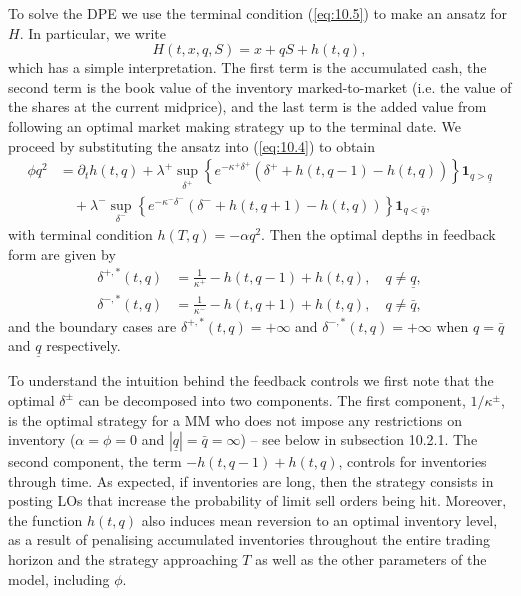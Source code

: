 \documentclass[11pt, a4paper]{book}
\newcommand{\Ind}{\mathbf{1}}
\begin{document}
	To solve the DPE we use the terminal condition (\ref{eq:10.5}) to make an ansatz for $H$. In particular, we write
	\begin{equation}
		H(t, x, q, S) = x + q S + h(t, q), \label{eq:10.6}
	\end{equation}
	which has a simple interpretation. The first term is the accumulated cash, the second term is the book value of the inventory marked-to-market (i.e. the value of the shares at the current midprice), and the last term is the added value from following an optimal market making strategy up to the terminal date.
	We proceed by substituting the ansatz into (\ref{eq:10.4}) to obtain
	\begin{equation}
		\begin{aligned}
			\phi q^2 &= \partial_t h(t, q) + \lambda^+ \sup_{\delta^+} \left\{ e^{-\kappa^+ \delta^+} \left( \delta^+ + h(t, q-1) - h(t, q) \right) \right\} \Ind_{q > \underline{q}} \\
			&\quad + \lambda^- \sup_{\delta^-} \left\{ e^{-\kappa^- \delta^-} \left( \delta^- + h(t, q+1) - h(t, q) \right) \right\} \Ind_{q < \bar{q}},
		\end{aligned} \label{eq:10.7}
	\end{equation}
	with terminal condition $h(T, q) = -\alpha q^2$.
	Then the optimal depths in feedback form are given by
	\begin{subequations}
		\begin{align}
			\delta^{+, *}(t, q) &= \frac{1}{\kappa^+} - h(t, q-1) + h(t, q), \quad q \neq \underline{q}, \label{eq:10.8a} \\
			\delta^{-, *}(t, q) &= \frac{1}{\kappa^-} - h(t, q+1) + h(t, q), \quad q \neq \bar{q}, \label{eq:10.8b}
		\end{align}
	\end{subequations}
	and the boundary cases are $\delta^{+, *}(t, q) = +\infty$ and $\delta^{-, *}(t, q) = +\infty$ when $q = \bar{q}$ and $\underline{q}$ respectively.
	
	To understand the intuition behind the feedback controls we first note that the optimal $\delta^\pm$ can be decomposed into two components. The first component, $1/\kappa^\pm$, is the optimal strategy for a MM who does not impose any restrictions on inventory ($\alpha = \phi = 0$ and $|\underline{q}| = \bar{q} = \infty$) – see below in subsection 10.2.1.
	The second component, the term $-h(t, q-1) + h(t, q)$, controls for inventories through time. As expected, if inventories are long, then the strategy consists in posting LOs that increase the probability of limit sell orders being hit. Moreover, the function $h(t, q)$ also induces mean reversion to an optimal inventory level, as a result of penalising accumulated inventories throughout the entire trading horizon and the strategy approaching $T$ as well as the other parameters of the model, including $\phi$.
	
\end{document}
